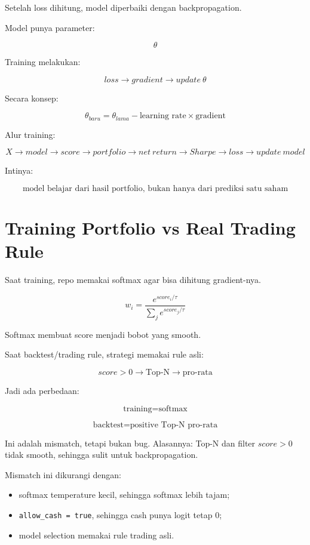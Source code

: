 \documentclass[11pt,a4paper]{article}
\begin{document}
Setelah loss dihitung, model diperbaiki dengan backpropagation.

Model punya parameter:

\[
\theta
\]

Training melakukan:

\[
loss
\rightarrow
gradient
\rightarrow
update\ \theta
\]

Secara konsep:

\[
\boxed{
\theta_{baru}
=
\theta_{lama}
-
\text{learning rate} \times \text{gradient}
}
\]

Alur training:

\[
X
\rightarrow
model
\rightarrow
score
\rightarrow
portfolio
\rightarrow
net\ return
\rightarrow
Sharpe
\rightarrow
loss
\rightarrow
update\ model
\]

Intinya:

\[
\boxed{
\text{model belajar dari hasil portfolio, bukan hanya dari prediksi satu saham}
}
\]

\section{Training Portfolio vs Real Trading Rule}

Saat training, repo memakai softmax agar bisa dihitung gradient-nya.

\[
\boxed{
w_i =
\frac{e^{score_i/\tau}}
{\sum_j e^{score_j/\tau}}
}
\]

Softmax membuat score menjadi bobot yang smooth.

Saat backtest/trading rule, strategi memakai rule asli:

\[
\boxed{
score > 0
\rightarrow
\text{Top-N}
\rightarrow
\text{pro-rata}
}
\]

Jadi ada perbedaan:

\[
\text{training} = \text{softmax}
\]

\[
\text{backtest} = \text{positive Top-N pro-rata}
\]

Ini adalah mismatch, tetapi bukan bug.
Alasannya: Top-N dan filter \(score>0\) tidak smooth, sehingga sulit untuk backpropagation.

Mismatch ini dikurangi dengan:

\begin{itemize}[leftmargin=*]
    \item softmax temperature kecil, sehingga softmax lebih tajam;
    \item \texttt{allow\_cash = true}, sehingga cash punya logit tetap 0;
    \item model selection memakai rule trading asli.
\end{itemize}
\end{document}
